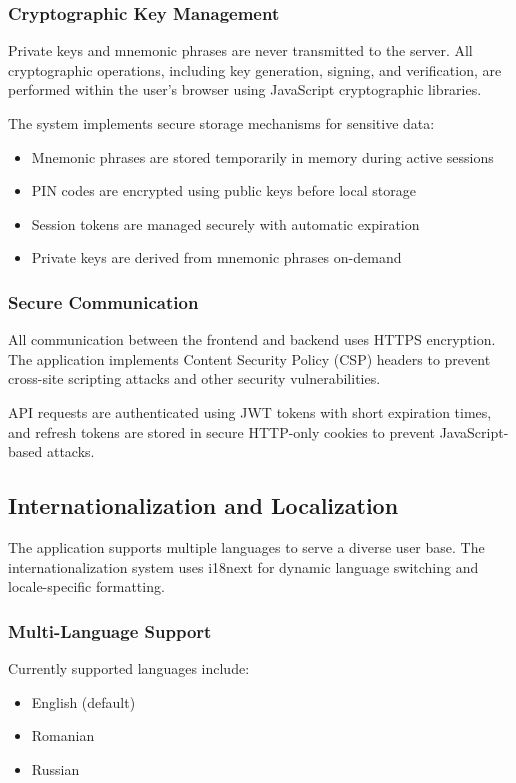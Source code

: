 \subsubsection{Cryptographic Key Management}
Private keys and mnemonic phrases are never transmitted to the server. All cryptographic operations, including key generation, signing, and verification, are performed within the user's browser using JavaScript cryptographic libraries.

The system implements secure storage mechanisms for sensitive data:
\begin{itemize}
    \item Mnemonic phrases are stored temporarily in memory during active sessions
    \item PIN codes are encrypted using public keys before local storage
    \item Session tokens are managed securely with automatic expiration
    \item Private keys are derived from mnemonic phrases on-demand
\end{itemize}

\subsubsection{Secure Communication}
All communication between the frontend and backend uses HTTPS encryption. The application implements Content Security Policy (CSP) headers to prevent cross-site scripting attacks and other security vulnerabilities.

API requests are authenticated using JWT tokens with short expiration times, and refresh tokens are stored in secure HTTP-only cookies to prevent JavaScript-based attacks.

\subsection{Internationalization and Localization}
The application supports multiple languages to serve a diverse user base. The internationalization system uses i18next for dynamic language switching and locale-specific formatting.

\subsubsection{Multi-Language Support}
Currently supported languages include:
\begin{itemize}
    \item English (default)
    \item Romanian
    \item Russian
\end{itemize}

